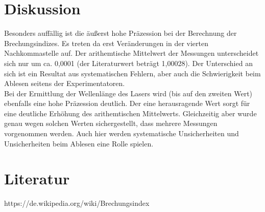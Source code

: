 \section{Diskussion}
\label{sec:Diskussion}

Besonders auffällig ist die äußerst hohe Präzession bei der Berechnung der Brechungsindizes. Es treten da erst Veränderungen in der vierten Nachkommastelle auf. Der arithemtische Mittelwert der Messungen unterscheidet sich nur um ca. 0,0001 (der Literaturwert beträgt 1,00028). Der Unterschied an sich ist ein Resultat aus systematischen Fehlern, aber auch die Schwierigkeit beim Ablesen seitens der Experimentatoren.\\
Bei der Ermittlung der Wellenlänge des Lasers wird (bis auf den zweiten Wert) ebenfalls eine hohe Präzession deutlich. Der eine herausragende Wert sorgt für eine deutliche Erhöhung des arithemtischen Mittelwerts. Gleichzeitig aber wurde genau wegen solchen Werten sichergestellt, dass mehrere Messungen vorgenommen werden. Auch hier werden systematische Unsicherheiten und Unsicherheiten beim Ablesen eine Rolle spielen.

\section{Literatur}

https://de.wikipedia.org/wiki/Brechungsindex
